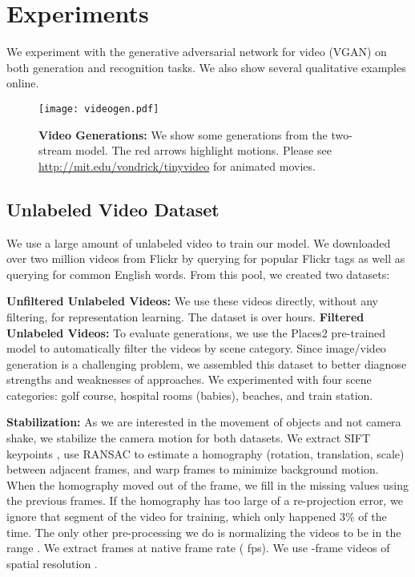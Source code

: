 \documentclass{article}
\begin{document}
\section{Experiments}

We experiment with the generative adversarial network for video (VGAN) on both generation and recognition tasks. We also show several qualitative examples online.

\begin{figure}
\texttt{[image: videogen.pdf]}
\caption{\textbf{Video Generations:} We show some generations from the two-stream model. The red arrows highlight motions. Please see \url{http://mit.edu/vondrick/tinyvideo} for animated movies.}
\label{fig:generations}
\vspace{-1em}
\end{figure}

\subsection{Unlabeled Video Dataset}

We use a large amount of unlabeled video to train our model. We downloaded over two million videos from Flickr \cite{thomee2016yfcc100m} by querying for popular Flickr tags as well as querying for common English words. From this pool, we created two datasets:

\textbf{Unfiltered Unlabeled Videos:} We use these videos directly, without any filtering, for representation learning. The dataset is over  hours. \textbf{Filtered Unlabeled Videos:} To evaluate generations, we use the Places2 pre-trained model \cite{zhou2014learning} to automatically filter the videos by scene category. Since image/video generation is a challenging problem, we assembled this dataset to better diagnose strengths and weaknesses of approaches. We experimented with four scene categories: golf course, hospital rooms (babies), beaches, and train station. 

\textbf{Stabilization:} As we are interested in the movement of objects and not camera shake, we stabilize the camera motion for both datasets. We extract SIFT keypoints \cite{lowe1999object}, use RANSAC to estimate a homography (rotation, translation, scale) between adjacent frames, and warp frames to minimize background motion. When the homography moved out of the frame, we fill in the missing values using the previous frames. If the homography has too large of a re-projection error, we ignore that segment of the video for training, which only happened 3\% of the time. The only other pre-processing we do is normalizing the videos to be in the range . We extract frames at native frame rate ( fps). We use -frame videos of spatial resolution .
\end{document}
